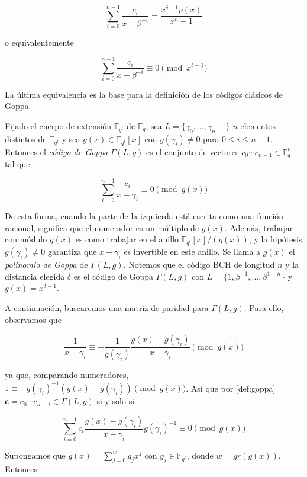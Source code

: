 $$\sum_{i=0}^{n-1} \frac{c_i}{x - \beta ^{-i}} = \frac{x^{\delta - 1} p(x)}{x^n - 1}$$

o equivalentemente

$$\sum_{i=0}^{n-1} \frac{c_i}{x - \beta ^{-i}} \equiv 0 \pmod{x^{\delta - 1}}$$

La última equivalencia es la base para la definición de los códigos clásicos de Goppa.

Fijado el cuerpo de extensión $\mathbb{F}_{q^t}$ de $\mathbb{F}_q$, sea $L = \{ \gamma_0, ..., \gamma_{n-1} \}$ $n$ elementos distintos de $\mathbb{F}_{q^t}$ y sea $g(x) \in \mathbb{F}_{q^t}[x]$ con $g(\gamma_i) \neq 0$ para $0 \leq i \leq n - 1$. Entonces el \emph{código de Goppa} $\Gamma(L,g)$ es el conjunto de vectores $c_0 \cdots c_{n-1} \in \mathbb{F}_q^n$ tal que 

\begin{equation}
    \label{def:goppa}
    \sum_{i=0}^{n-1} \frac{c_i}{x - \gamma_i} \equiv 0 \pmod{g(x)}
\end{equation}

De esta forma, cuando la parte de la izquierda está escrita como una función racional, significa que el numerador es un múltiplo de $g(x)$. Además, trabajar con módulo $g(x)$ es como trabajar en el anillo $\mathbb{F}_{q^t}[x]/(g(x))$, y la hipótesis $g(\gamma_i) \neq 0$ garantiza que $x - \gamma_i$ es invertible en este anillo. Se llama a $g(x)$ el \emph{polinomio de Goppa} de $\Gamma(L,g)$. Notemos que el código BCH de longitud $n$ y la distancia elegida $\delta$ es el código de Goppa $\Gamma(L,g)$ con $L = \{ 1, \beta^{-1}, ..., \beta^{1-n} \}$ y $g(x) = x^{\delta - 1}$.

A continuación, buscaremos una matriz de paridad para $\Gamma(L,g)$. Para ello, observamos que

$$\frac{1}{x - \gamma_i} \equiv - \frac{1}{g(\gamma_i)} \frac{g(x) - g(\gamma_i)}{x - \gamma_i} \pmod{ g(x)}$$

ya que, comparando numeradores, $1 \equiv - g(\gamma_i)^{-1} \left( g(x) - g(\gamma_i) \right) \pmod{g(x)}$. Así que por \eqref{def:goppa} $\textbf{c} = c_0 \cdots c_{n-1} \in \Gamma(L,g)$ si y solo si

\begin{equation}
    \label{congruencia_goppa}
    \sum_{i=0}^{n-1} c_i \frac{g(x) - g(\gamma_i)}{x - \gamma_i} g(\gamma_i)^{-1} \equiv 0 \pmod{g(x)}
\end{equation}

Supongamos que $g(x) = \sum_{j=0}^w g_j x^j$ con $g_j \in \mathbb{F}_{q^t}$, donde $w = gr(g(x))$. Entonces

